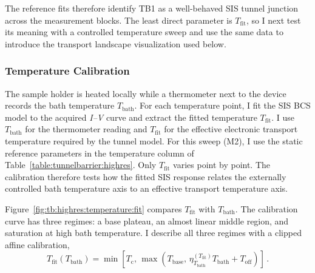     The reference fits therefore identify TB1 as a well-behaved SIS tunnel junction across the measurement blocks. The least direct parameter is $T_\mathrm{fit}$, so I next test its meaning with a controlled temperature sweep and use the same data to introduce the transport landscape visualization used below.

    \subsubsection*{Temperature Calibration}
    \label{subsec:tb:highres:temperature-calibration}


        The sample holder is heated locally while a thermometer next to the device records the bath temperature $T_\mathrm{bath}$. For each temperature point, I fit the SIS BCS model to the acquired \textit{I--V} curve and extract the fitted temperature $T_\mathrm{fit}$. I use $T_\mathrm{bath}$ for the thermometer reading and $T_\mathrm{fit}$ for the effective electronic transport temperature required by the tunnel model. For this sweep (M2), I use the static reference parameters in the temperature column of Table~\ref{table:tunnelbarrier:highres}. Only $T_\mathrm{fit}$ varies point by point. The calibration therefore tests how the fitted SIS response relates the externally controlled bath temperature axis to an effective transport temperature axis.

        Figure~\ref{fig:tb:highres:temperature:fit} compares $T_\mathrm{fit}$ with $T_\mathrm{bath}$. The calibration curve has three regimes: a base plateau, an almost linear middle region, and saturation at high bath temperature. I describe all three regimes with a clipped affine calibration,
        \begin{equation}
            T_\mathrm{fit}(T_\mathrm{bath}) = \min\!\left[T_\mathrm{c},\,\max\!\left(T_\mathrm{base},\,\eta_{T_\mathrm{bath}}^{(T_\mathrm{fit})} T_\mathrm{bath}+T_\mathrm{off}\right)\right]\,.
            \label{eq:tb:highres:temperature:calibration}
        \end{equation}

